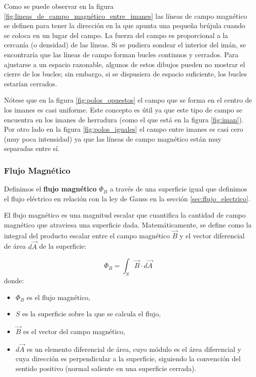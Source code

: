 Como se puede observar en la figura \ref{fig:lineas_de_campo_magnético_entre_imanes} las líneas de campo magnético se definen para tener la dirección en la que apunta una pequeña brújula cuando se coloca en un lugar del campo. La fuerza del campo es proporcional a la cercanía (o densidad) de las líneas. Si se pudiera sondear el interior del imán, se encontraría que las líneas de campo forman bucles continuos y cerrados. Para ajustarse a un espacio razonable, algunos de estos dibujos pueden no mostrar el cierre de los bucles; sin embargo, si se dispusiera de espacio suficiente, los bucles estarían cerrados. 

Nótese que en la figura \ref{fig:polos_opuestos} el campo que se forma en el centro de los imanes es casi uniforme. Este concepto es útil ya que este tipo de campo se encuentra en los imanes de herradura (como el que está en la figura \ref{fig:iman}). Por otro lado en la figura \ref{fig:polos_iguales} el campo entre imanes es casi cero (muy poca intensidad) ya que las líneas de campo magnético están muy separadas entre sí.

\subsubsection{Flujo Magnético}
\label{sec:flujo_magnético}

Definimos el \textbf{flujo magnético} \(\Phi_B\) a través de una superficie igual que definimos el flujo eléctrico en relación con la ley de Gauss en la sección \ref{sec:flujo_electrico}. 

El flujo magnético es una magnitud escalar que cuantifica la cantidad de campo magnético que atraviesa una superficie dada. Matemáticamente, se define como la integral del producto escalar entre el campo magnético \(\vec{B}\) y el vector diferencial de área \(d\vec{A}\) de la superficie:

\[
\Phi_B = \int_S \vec{B} \cdot d\vec{A}
\]
donde:
\begin{itemize}
  \item \(\Phi_B\) es el flujo magnético,
  \item \(S\) es la superficie sobre la que se calcula el flujo,
  \item \(\vec{B}\) es el vector del campo magnético,
  \item \(d\vec{A}\) es un elemento diferencial de área, cuyo módulo es el área diferencial y cuya dirección es perpendicular a la superficie, siguiendo la convención del sentido positivo (normal saliente en una superficie cerrada).
\end{itemize}

